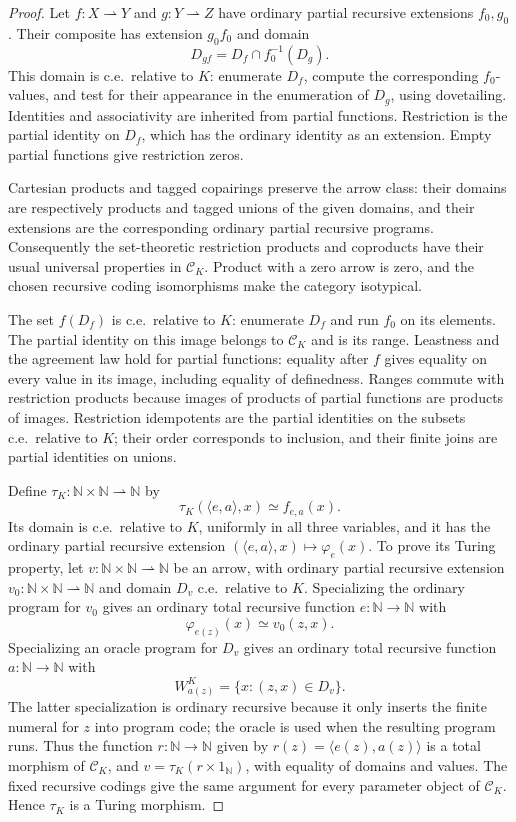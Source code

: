 \documentclass[11pt]{article}
\newcommand{\N}{\mathbb N}
\begin{document}
\begin{proof}
Let $f:X\rightharpoonup Y$ and $g:Y\rightharpoonup Z$ have
ordinary partial recursive extensions $f_0,g_0$. Their composite has
extension $g_0f_0$ and domain
\[
 D_{gf}=D_f\cap f_0^{-1}(D_g).
\]
This domain is c.e.\ relative to $K$: enumerate $D_f$, compute the
corresponding $f_0$-values, and test for their appearance in the
enumeration of $D_g$, using dovetailing. Identities and associativity
are inherited from partial functions. Restriction is the partial
identity on $D_f$, which has the ordinary identity as an extension.
Empty partial functions give restriction zeros.

Cartesian products and tagged copairings preserve the arrow class:
their domains are respectively products and tagged unions of the given
domains, and their extensions are the corresponding ordinary partial
recursive programs. Consequently the set-theoretic restriction
products and coproducts have their usual universal properties in
$\mathcal C_K$. Product with a zero arrow is zero, and the chosen
recursive coding isomorphisms make the category isotypical.

The set $f(D_f)$ is c.e.\ relative to $K$: enumerate $D_f$ and run
$f_0$ on its elements. The partial identity on this image belongs to
$\mathcal C_K$ and is its range. Leastness and the agreement law
hold for partial functions: equality after $f$ gives equality on
every value in its image, including equality of definedness.
Ranges commute with restriction products because images of products
of partial functions are products of images. Restriction idempotents
are the partial identities on the subsets c.e.\ relative to $K$;
their order corresponds to inclusion, and their finite joins are
partial identities on unions.

Define $\tau_K:\N\times\N\rightharpoonup\N$ by
\[
 \tau_K(\langle e,a\rangle,x)\simeq f_{e,a}(x).
\]
Its domain is c.e.\ relative to $K$, uniformly in all three
variables, and it has the ordinary partial recursive extension
$(\langle e,a\rangle,x)\mapsto\varphi_e(x)$.
To prove its Turing property, let
$v:\N\times\N\rightharpoonup\N$ be an arrow, with ordinary
partial recursive extension $v_0:\N\times\N\rightharpoonup\N$ and
domain $D_v$ c.e.\ relative to $K$. Specializing the ordinary program
for $v_0$ gives an ordinary total recursive function $e:\N\to\N$ with
\[
 \varphi_{e(z)}(x)\simeq v_0(z,x).
\]
Specializing an oracle program for $D_v$ gives an ordinary total
recursive function $a:\N\to\N$ with
\[
 W_{a(z)}^K=\{x:(z,x)\in D_v\}.
\]
The latter specialization is ordinary recursive because it only
inserts the finite numeral for $z$ into program code; the oracle is
used when the resulting program runs. Thus the function
$r:\N\to\N$ given by $r(z)=\langle e(z),a(z)\rangle$ is a total
morphism of $\mathcal C_K$, and
$v=\tau_K(r\times1_{\N})$, with equality of domains and values.
The fixed recursive codings give the same argument for every parameter
object of $\mathcal C_K$. Hence $\tau_K$ is a Turing morphism.


\end{proof}
\end{document}
